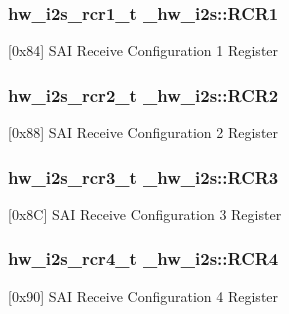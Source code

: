 \subsubsection[{\texorpdfstring{R\+C\+R1}{RCR1}}]{ {\bf hw\+\_\+i2s\+\_\+rcr1\+\_\+t} \+\_\+hw\+\_\+i2s\+::\+R\+C\+R1}\hypertarget{struct__hw__i2s_a7cd67d62a805109ac2d2afb253949b4a}{}\label{struct__hw__i2s_a7cd67d62a805109ac2d2afb253949b4a}
\mbox{[}0x84\mbox{]} S\+AI Receive Configuration 1 Register 
\subsubsection[{\texorpdfstring{R\+C\+R2}{RCR2}}]{ {\bf hw\+\_\+i2s\+\_\+rcr2\+\_\+t} \+\_\+hw\+\_\+i2s\+::\+R\+C\+R2}\hypertarget{struct__hw__i2s_abf1c17667566ee6ec92976b9fba95c63}{}\label{struct__hw__i2s_abf1c17667566ee6ec92976b9fba95c63}
\mbox{[}0x88\mbox{]} S\+AI Receive Configuration 2 Register 
\subsubsection[{\texorpdfstring{R\+C\+R3}{RCR3}}]{ {\bf hw\+\_\+i2s\+\_\+rcr3\+\_\+t} \+\_\+hw\+\_\+i2s\+::\+R\+C\+R3}\hypertarget{struct__hw__i2s_a7750073085b1396644510b86a00f85ca}{}\label{struct__hw__i2s_a7750073085b1396644510b86a00f85ca}
\mbox{[}0x8C\mbox{]} S\+AI Receive Configuration 3 Register 
\subsubsection[{\texorpdfstring{R\+C\+R4}{RCR4}}]{ {\bf hw\+\_\+i2s\+\_\+rcr4\+\_\+t} \+\_\+hw\+\_\+i2s\+::\+R\+C\+R4}\hypertarget{struct__hw__i2s_a775d2c16fb4390e2fb1f581424fcfa63}{}\label{struct__hw__i2s_a775d2c16fb4390e2fb1f581424fcfa63}
\mbox{[}0x90\mbox{]} S\+AI Receive Configuration 4 Register 
